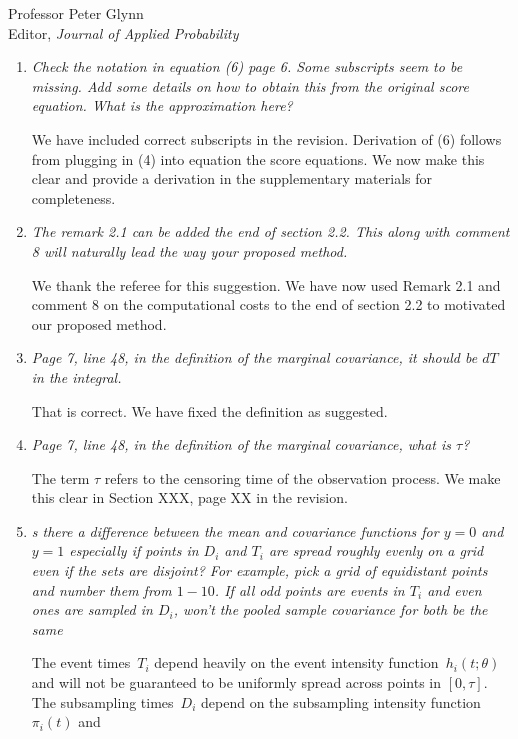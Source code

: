 \documentclass[11pt]{letter} %
\begin{document}
\begin{letter}{Professor
	Peter Glynn\\
	Editor, {\em Journal of Applied Probability}}
\begin{enumerate}
\item {\it Check the notation in equation (6) page 6. Some subscripts seem to be missing. Add some details on how to obtain this from the original score
equation. What is the approximation here?}

\vspace{5mm}
We have included correct subscripts in the revision.  Derivation of (6) follows from plugging in (4) into equation the score equations.  We now make this clear and provide a derivation in the supplementary materials for completeness.
\vspace{5mm}

\item{\it The remark 2.1 can be added the end of section 2.2. This along with
comment 8 will naturally lead the way your proposed method.}

\vspace{5mm}
We thank the referee for this suggestion.  We have now used Remark 2.1 and comment 8 on the computational costs to the end of section 2.2 to motivated our proposed method.
\vspace{5mm}

\item {\it Page 7, line 48, in the definition of the marginal covariance, it should be $dT$ in the integral.}

\vspace{5mm}
That is correct.  We have fixed the definition as suggested.
\vspace{5mm}

\item {\it Page 7, line 48, in the definition of the marginal covariance, what is $\tau$?}

\vspace{5mm}
The term $\tau$ refers to the censoring time of the observation process. We make this clear in Section XXX, page XX in the revision.
\vspace{5mm}


\item {\it s there a difference between the mean and covariance functions for $y = 0$ and $y = 1$ especially if points in $D_i$ and $T_i$ are spread roughly evenly on a grid even if the sets are disjoint? For example, pick a grid of equidistant points and number them from $1-10$. If all odd points are events in $T_i$ and even ones are sampled in $D_i$, won't the pooled sample covariance for both be the same}

\vspace{5mm}
The event times~$T_i$ depend heavily on the event intensity function~$h_i (t;\theta)$ and will not be guaranteed to be uniformly spread across points in $[0,\tau]$.  The subsampling times~$D_i$ depend on the subsampling intensity function~$\pi_i(t)$ and
\vspace{5mm}


\end{enumerate}
\end{letter}
\end{document}
